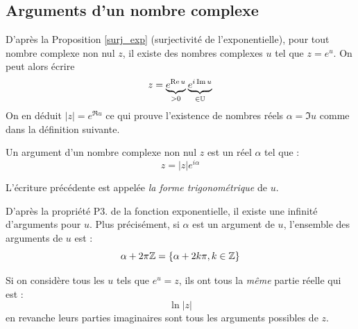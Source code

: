 \subsection{Arguments d'un nombre complexe}
D'après la Proposition \ref{surj_exp}{ (surjectivité de l'exponentielle)}, pour tout nombre complexe non nul $z$, il existe des nombres complexes $u$ tel que $z=e^{u}$. On peut alors écrire
\begin{displaymath}
 z = \underset{>0}{\underbrace{e^{\mathop{\mathrm{Re}} u}}}\:\underset{\in \mathbb{U}}{\underbrace{e^{i\mathop{\mathrm{Im}} u}}}
\end{displaymath}
On en déduit $|z|=e^{\Re u}$ ce qui prouve l'existence de nombres réels $\alpha = \Im u$ comme dans la définition suivante.
\begin{defi}
 Un argument  d'un nombre complexe non nul $z$ est un réel $\alpha$ tel que :
 \begin{displaymath}
 z = |z|e^{i\alpha}
\end{displaymath}
\begin{rems}
 \item L'écriture précédente est appelée \emph{la forme trigonométrique} de $u$.
 \item D'après la propriété P3. de la fonction exponentielle, il existe une infinité d'arguments pour $u$. Plus précisément, si $\alpha$ est un argument de $u$, l'ensemble des arguments de $u$ est :
\begin{displaymath}
 \alpha + 2\pi \mathbb{Z} = \{\alpha +2k\pi , k\in \mathbb{Z}\}
\end{displaymath}

\item Si on considère tous les $u$ tels que $e^u=z$, ils ont tous la \emph{même} partie réelle qui est :
\begin{displaymath}
 \ln |z|
\end{displaymath}
en revanche leurs parties imaginaires sont tous les arguments possibles de $z$.


\end{rems}
\end{defi}
